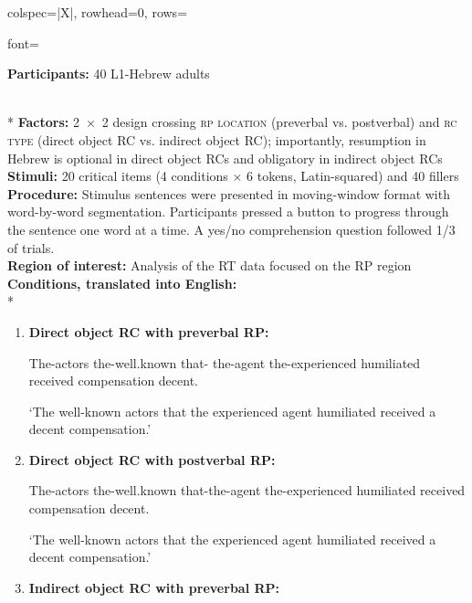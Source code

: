 \begin{longtblr}[caption={\textcite{fadlon.etal2018}: Self-paced reading task in Experiment 1}, label={tblr:fadlon2}]{colspec={|X|}, rowhead=0, rows={font=\raggedright{}}}\hline
\textbf{Participants:} 40 L1-Hebrew adults \vspace{5pt}\rule{0pt}{10pt}\\*
\textbf{Factors:} 2~×~2 design crossing \textsc{rp location} (preverbal vs. postverbal) and \textsc{rc type} (direct object RC vs. indirect object RC); importantly, resumption in Hebrew is optional in direct object RCs and obligatory in indirect object RCs \vspace{5pt}\\
\textbf{Stimuli:} 20 critical items (4 conditions × 6 tokens, Latin-squared) and 40 fillers \vspace{5pt}\\
\textbf{Procedure:} Stimulus sentences were presented in moving-window format with word-by-word segmentation. Participants pressed a button to progress through the sentence one word at a time. A yes/no comprehension question followed 1/3 of trials. \vspace{5pt}\\
\textbf{Region of interest:} Analysis of the RT data focused on the RP region \vspace{5pt}\\
\textbf{Conditions, translated into English:} \vspace{5pt}\\*
\begin{varwidth}{\linewidth}\begin{enumerate}[\bfseries (a),itemsep=5pt] 
\item \textbf{Direct object RC with preverbal RP:}\par\nobreak
The-actors the-well.known that- the-agent the-experienced humiliated received compensation decent.\par\nobreak
`The well-known actors that the experienced agent humiliated received a decent compensation.'
\item \textbf{Direct object RC with postverbal RP:}\par\nobreak
The-actors the-well.known that-the-agent the-experienced humiliated  received compensation decent.\par\nobreak
`The well-known actors that the experienced agent humiliated received a decent compensation.'
\item \textbf{Indirect object RC with preverbal RP:}\par\nobreak

\end{enumerate}
\end{varwidth}
\end{longtblr}
